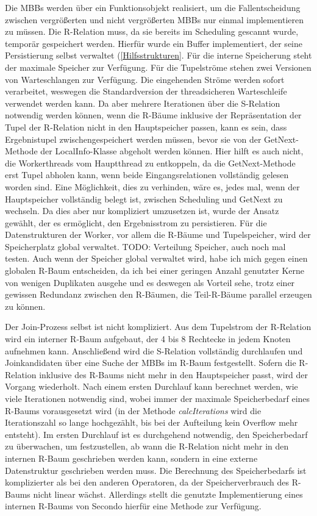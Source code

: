 \documentclass[a4paper,12pt,twoside]{article}
\newcommand{\Fb}[1]{\textit{#1}} %
\begin{document}
{Die MBBs werden über ein Funktionsobjekt realisiert, um die Fallentscheidung zwischen vergrößerten und nicht vergrößerten MBBs nur einmal implementieren zu müssen. Die R-Relation muss, da sie bereits im Scheduling gescannt wurde, temporär gespeichert werden. Hierfür wurde ein Buffer implementiert, der seine Persistierung selbst verwaltet (\autoref{Hilfsstrukturen}. Für die interne Speicherung steht der maximale Speicher zur Verfügung. Für die Tupelströme stehen zwei Versionen von Warteschlangen zur Verfügung. Die eingehenden Ströme werden sofort verarbeitet, weswegen die Standardversion der threadsicheren Warteschleife verwendet werden kann. Da aber mehrere Iterationen über die S-Relation notwendig werden können, wenn die R-Bäume inklusive der Repräsentation der Tupel der R-Relation nicht in den Hauptspeicher passen, kann es sein, dass Ergebnistupel zwischengespeichert werden müssen, bevor sie von der GetNext-Methode der LocalInfo-Klasse abgeholt werden können. Hier hilft es auch nicht, die Workerthreads vom Hauptthread zu entkoppeln, da die GetNext-Methode erst Tupel abholen kann, wenn beide Eingangsrelationen vollständig gelesen worden sind. Eine Möglichkeit, dies zu verhinden, wäre es, jedes mal, wenn der Hauptspeicher vollständig belegt ist, zwischen Scheduling und GetNext zu wechseln. Da dies aber nur kompliziert umzusetzen ist, wurde der Ansatz gewählt, der es ermöglicht, den Ergebnisstrom zu persistieren. Für die Datenstrukturen der Worker, vor allem die R-Bäume und Tupelspeicher, wird der Speicherplatz global verwaltet. TODO: Verteilung Speicher, auch noch mal testen. Auch wenn der Speicher global verwaltet wird, habe ich mich gegen einen globalen R-Baum entscheiden, da ich bei einer geringen Anzahl genutzter Kerne von wenigen Duplikaten ausgehe und es deswegen als Vorteil sehe, trotz einer gewissen Redundanz zwischen den R-Bäumen, die Teil-R-Bäume parallel erzeugen zu können.

Der Join-Prozess selbst ist nicht kompliziert. Aus dem Tupelstrom der R-Relation wird ein interner R-Baum aufgebaut, der 4 bis 8 Rechtecke in jedem Knoten aufnehmen kann. Anschließend wird die S-Relation vollständig durchlaufen und Joinkandidaten über eine Suche der MBBs im R-Baum festgestellt. Sofern die R-Relation inklusive des R-Baums nicht mehr in den Hauptspeicher passt, wird der Vorgang wiederholt. Nach einem ersten Durchlauf kann berechnet werden, wie viele Iterationen notwendig sind, wobei immer der maximale Speicherbedarf eines R-Baums vorausgesetzt wird (in der Methode \Fb{calcIterations} wird die Iterationszahl so lange hochgezählt, bis bei der Aufteilung kein Overflow mehr entsteht). Im ersten Durchlauf ist es durchgehend notwendig, den Speicherbedarf zu überwachen, um festzustellen, ab wann die R-Relation nicht mehr in den internen R-Baum geschrieben werden kann, sondern in eine externe Datenstruktur geschrieben werden muss. Die Berechnung des Speicherbedarfs ist komplizierter als bei den anderen Operatoren, da der Speicherverbrauch des R-Baums nicht linear wächst. Allerdings stellt die genutzte Implementierung eines internen R-Baums von Secondo hierfür eine Methode zur Verfügung.

}
\end{document}
